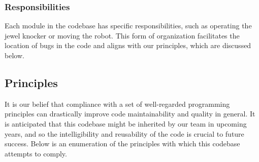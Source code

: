 \documentclass[letterpaper]{article}
\begin{document}
\subsubsection{Responsibilities}

Each module in the codebase has specific responsibilities, such as operating the jewel knocker or moving the robot. This form of organization facilitates the location of bugs in the code and aligns with our principles, which are discussed below.

\subsection{Principles}

It is our belief that compliance with a set of well-regarded programming principles can drastically improve code maintainability and quality in general. It is anticipated that this codebase might be inherited by our team in upcoming years, and so the intelligibility and reusability of the code is crucial to future success. Below is an enumeration of the principles with which this codebase attempts to comply.
\end{document}

